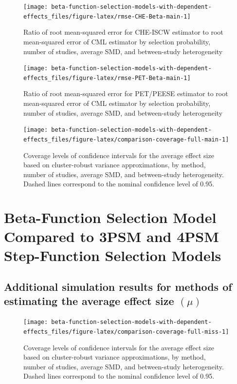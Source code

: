 \documentclass[
  man, donotrepeattitle,floatsintext]{apa7}
\begin{document}
\begin{figure}
\texttt{[image: beta-function-selection-models-with-dependent-effects\_files/figure-latex/rmse-CHE-Beta-main-1]} \caption{Ratio of root mean-squared error for CHE-ISCW estimator to root mean-squared error of CML estimator by selection probability, number of studies, average SMD, and between-study heterogeneity}\label{fig:rmse-CHE-Beta-main}
\end{figure}

\begin{figure}
\texttt{[image: beta-function-selection-models-with-dependent-effects\_files/figure-latex/rmse-PET-Beta-main-1]} \caption{Ratio of root mean-squared error for PET/PEESE estimator to root mean-squared error of CML estimator by selection probability, number of studies, average SMD, and between-study heterogeneity}\label{fig:rmse-PET-Beta-main}
\end{figure}

\begin{figure}
\texttt{[image: beta-function-selection-models-with-dependent-effects\_files/figure-latex/comparison-coverage-full-main-1]} \caption{Coverage levels of confidence intervals for the average effect size based on cluster-robust variance approximations, by method, number of studies, average SMD, and between-study heterogeneity. Dashed lines correspond to the nominal confidence level of 0.95.}\label{fig:comparison-coverage-full-main}
\end{figure}

\section{Beta-Function Selection Model Compared to 3PSM and 4PSM Step-Function Selection Models}\label{beta-function-selection-model-compared-to-3psm-and-4psm-step-function-selection-models}

\subsection{\texorpdfstring{Additional simulation results for methods of estimating the average effect size \((\mu)\)}{Additional simulation results for methods of estimating the average effect size (\textbackslash mu)}}\label{mu-simulation-results-miss}

\begin{figure}
\texttt{[image: beta-function-selection-models-with-dependent-effects\_files/figure-latex/comparison-coverage-full-miss-1]} \caption{Coverage levels of confidence intervals for the average effect size based on cluster-robust variance approximations, by method, number of studies, average SMD, and between-study heterogeneity. Dashed lines correspond to the nominal confidence level of 0.95.}\label{fig:comparison-coverage-full-miss}
\end{figure}
\end{document}
